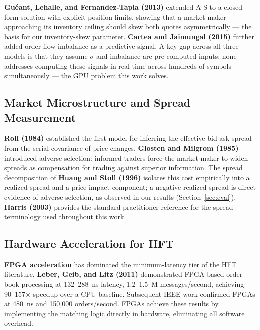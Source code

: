 \documentclass[12pt]{article}
\begin{document}
\textbf{Guéant, Lehalle, and Fernandez-Tapia (2013)} \cite{gueant2013}
extended A-S to a closed-form solution with explicit position limits, showing
that a market maker approaching its inventory ceiling should skew both quotes
asymmetrically — the basis for our inventory-skew parameter.
\textbf{Cartea and Jaimungal (2015)} \cite{cartea2015} further added
order-flow imbalance as a predictive signal. A key gap across all three models
is that they assume $\sigma$ and imbalance are pre-computed inputs; none
addresses computing these signals in real time across hundreds of symbols
simultaneously — the GPU problem this work solves.

\subsection{Market Microstructure and Spread Measurement}

\textbf{Roll (1984)} \cite{roll1984} established the first model for
inferring the effective bid-ask spread from the serial covariance of price
changes. \textbf{Glosten and Milgrom (1985)} \cite{glosten1985} introduced
adverse selection: informed traders force the market maker to widen spreads
as compensation for trading against superior information. The spread
decomposition of \textbf{Huang and Stoll (1996)} \cite{huang1996} isolates
this cost empirically into a realized spread and a price-impact component;
a negative realized spread is direct evidence of adverse selection, as
observed in our results (Section~\ref{sec:eval}).
\textbf{Harris (2003)} \cite{harris2003} provides the standard practitioner
reference for the spread terminology used throughout this work.

\subsection{Hardware Acceleration for HFT}

\textbf{FPGA acceleration} has dominated the minimum-latency tier of the HFT
literature. \textbf{Leber, Geib, and Litz (2011)} \cite{leber2011}
demonstrated FPGA-based order book processing at 132--288~ns latency,
1.2--1.5~M messages/second, achieving 90--157$\times$ speedup over a CPU
baseline. Subsequent IEEE work confirmed FPGAs at 480~ns and 150{,}000
orders/second. FPGAs achieve these results by implementing the matching
logic directly in hardware, eliminating all software overhead.
\end{document}
